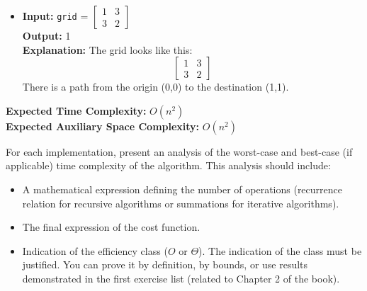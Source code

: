 \documentclass{article}
\begin{document}
\begin{enumerate}
\begin{itemize}
        \item \textbf{Input:} \texttt{grid} = \(\begin{bmatrix}1 & 3\\3 & 2\end{bmatrix}\) \\
        \textbf{Output:} 1 \\
        \textbf{Explanation:} The grid looks like this: \\
        \[
        \begin{bmatrix}
        1 & 3 \\
        3 & 2
        \end{bmatrix}
        \]
        There is a path from the origin (0,0) to the destination (1,1).
    \end{itemize}
    
    \textbf{Expected Time Complexity:} \( O(n^2) \) \\
    \textbf{Expected Auxiliary Space Complexity:} \( O(n^2) \)
    
\end{enumerate}

For each implementation, present an analysis of the worst-case and best-case (if applicable) time complexity of the algorithm. This analysis should include:

\begin{itemize}
    \item A mathematical expression defining the number of operations (recurrence relation for recursive algorithms or summations for iterative algorithms).
    \item The final expression of the cost function.
    \item Indication of the efficiency class ($O$ or $\Theta$). The indication of the class must be justified. You can prove it by definition, by bounds, or use results demonstrated in the first exercise list (related to Chapter 2 of the book).
\end{itemize}


%
%
\end{document}
